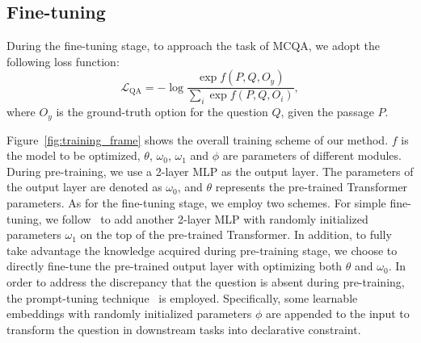 \vspace{-0.2cm}
\subsection{Fine-tuning}
\label{sec:method:fine-tuning}

During the fine-tuning stage, to approach the task of MCQA, we adopt the following loss function:
\begin{equation}
\mathcal{L}_{\mathrm{QA}}=-\log\frac{\exp{f(P,Q,O_y)}}{\sum_i\exp{f(P,Q,O_i)}},
\label{eqn:qa}
\end{equation}
where $O_y$ is the ground-truth option for the question $Q$, given the passage $P$.






Figure~\ref{fig:training_frame} shows the overall training scheme of our method. $f$ is the model to be optimized, $\theta$, $\omega_0$, $\omega_1$ and $\phi$ are parameters of different modules. 
During pre-training, we use a 2-layer MLP as the output layer. The parameters of the output layer are denoted as $\omega_0$, and $\theta$ represents the pre-trained Transformer parameters.
As for the fine-tuning stage, we employ two schemes. 
For simple fine-tuning, we follow~\citet{bert} to add another 2-layer MLP with randomly initialized parameters $\omega_1$ on the top of the pre-trained Transformer.
In addition, to fully take advantage the knowledge acquired during pre-training stage, we choose to directly fine-tune the pre-trained output layer with optimizing both $\theta$ and $\omega_0$.
In order to address the discrepancy that the question is absent during pre-training, the prompt-tuning technique~\citep{prompt-tuning} is employed.
Specifically, some learnable embeddings with randomly initialized parameters $\phi$ are appended to the input to transform the question in downstream tasks into declarative constraint.
